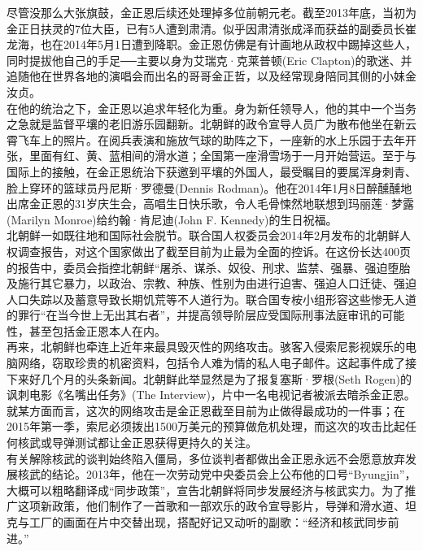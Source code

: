 尽管没那么大张旗鼓，金正恩后续还处理掉多位前朝元老。截至2013年底，当初为金正日扶灵的7位大臣，已有5人遭到肃清。似乎因肃清张成泽而获益的副委员长崔龙海，也在2014年5月1日遭到降职。金正恩仿佛是有计画地从政权中踢掉这些人，同时提拔他自己的手足──主要以身为艾瑞克·克莱普顿(Eric Clapton)的歌迷、并追随他在世界各地的演唱会而出名的哥哥金正哲，以及经常现身陪同其侧的小妹金汝贞。\\

在他的统治之下，金正恩以追求年轻化为重。身为新任领导人，他的其中一个当务之急就是监督平壤的老旧游乐园翻新。北朝鲜的政令宣导人员广为散布他坐在新云霄飞车上的照片。在阅兵表演和施放气球的助阵之下，一座新的水上乐园于去年开张，里面有红、黄、蓝相间的滑水道；全国第一座滑雪场于一月开始营运。至于与国际上的接触，在金正恩统治下获邀到平壤的外国人，最受瞩目的要属浑身刺青、脸上穿环的篮球员丹尼斯·罗德曼(Dennis Rodman)。他在2014年1月8日醉醺醺地出席金正恩的31岁庆生会，高唱生日快乐歌，令人毛骨悚然地联想到玛丽莲·梦露(Marilyn Monroe)给约翰·肯尼迪(John F. Kennedy)的生日祝福。\\

北朝鲜一如既往地和国际社会脱节。联合国人权委员会2014年2月发布的北朝鲜人权调查报告，对这个国家做出了截至目前为止最为全面的控诉。在这份长达400页的报告中，委员会指控北朝鲜“屠杀、谋杀、奴役、刑求、监禁、强暴、强迫堕胎及施行其它暴力，以政治、宗教、种族、性别为由进行迫害、强迫人口迁徒、强迫人口失踪以及蓄意导致长期饥荒等不人道行为。联合国专桉小组形容这些惨无人道的罪行“在当今世上无出其右者”，并提高领导阶层应受国际刑事法庭审讯的可能性，甚至包括金正恩本人在内。\\

再来，北朝鲜也牵连上近年来最具毁灭性的网络攻击。骇客入侵索尼影视娱乐的电脑网络，窃取珍贵的机密资料，包括令人难为情的私人电子邮件。这起事件成了接下来好几个月的头条新闻。北朝鲜此举显然是为了报复塞斯·罗根(Seth Rogen)的讽刺电影《名嘴出任务》(The Interview)，片中一名电视记者被派去暗杀金正恩。就某方面而言，这次的网络攻击是金正恩截至目前为止做得最成功的一件事；在2015年第一季，索尼必须拨出1500万美元的预算做危机处理，而这次的攻击比起任何核武或导弹测试都让金正恩获得更持久的关注。\\

有关解除核武的谈判始终陷入僵局，多位谈判者都做出金正恩永远不会愿意放弃发展核武的结论。2013年，他在一次劳动党中央委员会上公布他的口号“Byungjin”，大概可以粗略翻译成“同步政策”，宣告北朝鲜将同步发展经济与核武实力。为了推广这项新政策，他们制作了一首歌和一部欢乐的政令宣导影片，导弹和滑水道、坦克与工厂的画面在片中交替出现，搭配好记又动听的副歌：“经济和核武同步前进。”\\

